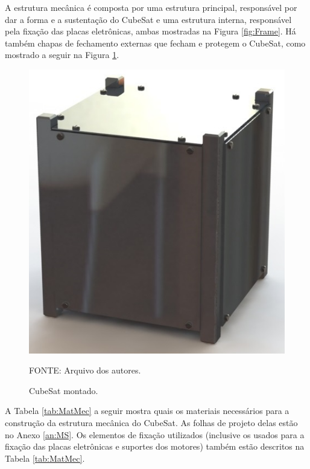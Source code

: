 \documentclass[
	12pt,				%
	openany,			%
	twoside,			%
	a4paper,			%
	english,			%
	french,				%
	spanish,			%
	brazil,				%
	oldfontcommands
	]{abntex2}
\begin{document}
\newpage

A estrutura mecânica é composta por uma estrutura principal, responsável por dar a forma e a sustentação do CubeSat e uma estrutura interna, responsável pela fixação das placas eletrônicas, ambas mostradas na Figura \ref{fig:Frame}. Há também chapas de fechamento externas que fecham e protegem o CubeSat, como mostrado a seguir na Figura \ref{fig:FrameFull}.

\begin{figure}[th]
	\caption{CubeSat montado.}
	\centering
	\includegraphics[width=0.5\linewidth]{./figs/Frame_Full}
	
	\begin{small}
		FONTE: Arquivo dos autores.
	\end{small}
	\label{fig:FrameFull}
\end{figure}

\newpage

A Tabela \ref{tab:MatMec} a seguir mostra quais os materiais necessários para a construção da estrutura mecânica do CubeSat. As folhas de projeto delas estão no Anexo \ref{an:MS}. Os elementos de fixação utilizados (inclusive os usados para a fixação das placas eletrônicas e suportes dos motores) também estão descritos na Tabela \ref{tab:MatMec}.
\end{document}
